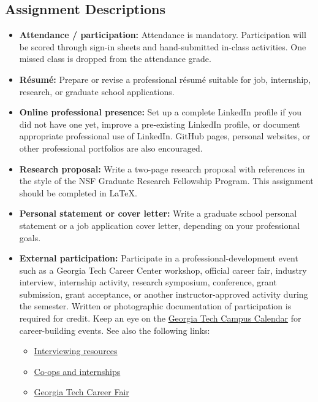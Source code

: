 \documentclass[11pt]{article}
\begin{document}
\subsection*{Assignment Descriptions}

\begin{itemize}
    \item \textbf{Attendance / participation:} Attendance is mandatory. Participation will be scored through sign-in sheets and hand-submitted in-class activities. One missed class is dropped from the attendance grade.

    \item \textbf{R\'esum\'e:} Prepare or revise a professional r\'esum\'e suitable for job, internship, research, or graduate school applications.

    \item \textbf{Online professional presence:} Set up a complete LinkedIn profile if you did not have one yet, improve a pre-existing LinkedIn profile, or document appropriate professional use of LinkedIn. GitHub pages, personal websites, or other professional portfolios are also encouraged.

    \item \textbf{Research proposal:} Write a two-page research proposal with references in the style of the NSF Graduate Research Fellowship Program. This assignment should be completed in \LaTeX.

    \item \textbf{Personal statement or cover letter:} Write a graduate school personal statement or a job application cover letter, depending on your professional goals.

    \item \textbf{External participation:} Participate in a professional-development event such as a Georgia Tech Career Center workshop, official career fair, industry interview, internship activity, research symposium, conference, grant submission, grant acceptance, or another instructor-approved activity during the semester. Written or photographic documentation of participation is required for credit. Keep an eye on the \href{https://calendar.gatech.edu/}{Georgia Tech Campus Calendar} for career-building events. See also the following links:
    \begin{itemize}
        \item \href{https://career.gatech.edu/interviewing/}{Interviewing resources}
        \item \href{https://career.gatech.edu/apply-for-co-ops-and-internships/}{Co-ops and internships}
        \item \href{https://careerfair.gatech.edu/}{Georgia Tech Career Fair}
    \end{itemize}
\end{itemize}
\end{document}
